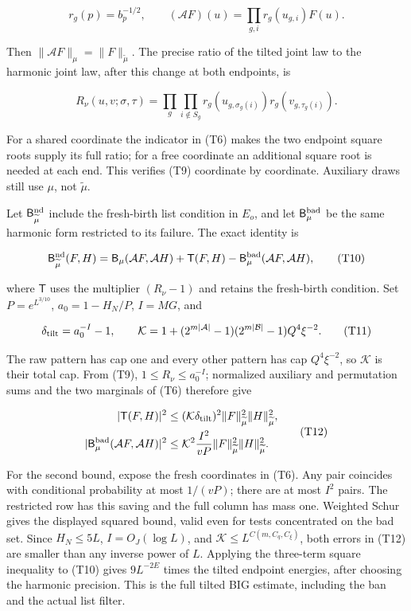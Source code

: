 \[
r_g(p)=b_p^{-1/2},\qquad
(\mathcal AF)(u)=\prod_{g,i}r_g(u_{g,i})F(u).
\tag{T8}
\]

Then \(\|\mathcal AF\|_\mu=\|F\|_{\widetilde\mu}\). The precise ratio of
the tilted joint law to the harmonic joint law, after this change at
both endpoints, is

\[
R_\nu(u,v;\sigma,\tau)=
 \prod_g\prod_{i\notin S_g}
 r_g(u_{g,\sigma_g(i)})r_g(v_{g,\tau_g(i)}).
\tag{T9}
\]

For a shared coordinate the indicator in (T6) makes the two endpoint
square roots supply its full ratio; for a free coordinate an additional
square root is needed at each end. This verifies (T9) coordinate by
coordinate. Auxiliary draws still use \(\mu\), not \(\widetilde\mu\).

Let \(\mathsf B_{\widetilde\mu}^{\rm nd}\) include the fresh-birth list
condition in \(E_o\), and let \(\mathsf B_\mu^{\rm bad}\) be the same
harmonic form restricted to its failure. The exact identity is

\[
\mathsf B_{\widetilde\mu}^{\rm nd}(F,H)
 =\mathsf B_\mu(\mathcal AF,\mathcal AH)
   +\mathsf T(F,H)-\mathsf B_\mu^{\rm bad}(\mathcal AF,\mathcal AH),
\tag{T10}
\]

where \(\mathsf T\) uses the multiplier \((R_\nu-1)\) and retains the
fresh-birth condition. Set \(P=e^{L^{3/10}}\), \(a_0=1-H_N/P\),
\(I=MG\), and

\[
\delta_{\rm tilt}=a_0^{-I}-1,\qquad
\mathcal K=1+(2^{m|\mathcal A|}-1)(2^{m|\mathcal B|}-1)Q^4\xi^{-2}.
\tag{T11}
\]

The raw pattern has cap one and every other pattern has cap
\(Q^4\xi^{-2}\), so \(\mathcal K\) is their total cap. From (T9),
\(1\le R_\nu\le a_0^{-I}\); normalized auxiliary and permutation sums
and the two marginals of (T6) therefore give

\[
\begin{aligned}
|\mathsf T(F,H)|^2
 &\le(\mathcal K\delta_{\rm tilt})^2
       \|F\|_{\widetilde\mu}^2\|H\|_{\widetilde\mu}^2,\\
|\mathsf B_\mu^{\rm bad}(\mathcal AF,\mathcal AH)|^2
 &\le\mathcal K^2\frac{I^2}{vP}
       \|F\|_{\widetilde\mu}^2\|H\|_{\widetilde\mu}^2.
\end{aligned}\tag{T12}
\]

For the second bound, expose the fresh coordinates in (T6). Any pair
coincides with conditional probability at most \(1/(vP)\); there are at
most \(I^2\) pairs. The restricted row has this saving and the full
column has mass one. Weighted Schur gives the displayed squared bound,
valid even for tests concentrated on the bad set. Since \(H_N\le5L\),
\(I=O_J(\log L)\), and \(\mathcal K\le L^{C(m,C_q,C_\xi)}\), both errors
in (T12) are smaller than any inverse power of \(L\). Applying the
three-term square inequality to (T10) gives \(9L^{-2E}\) times the
tilted endpoint energies, after choosing the harmonic precision. This is
the full tilted BIG estimate, including the ban and the actual list
filter.

